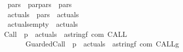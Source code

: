 \begin{isabellebody}
\ \ {\isachardoublequoteopen}{\isacharunderscore}pars{\isachardoublequoteclose}\ {\isacharcolon}{\isacharcolon}\ {\isachardoublequoteopen}{\isacharbrackleft}par{\isacharcomma}pars{\isacharbrackright}\ {\isasymRightarrow}\ pars{\isachardoublequoteclose}\ \ \ \ \ \ \ \ \ \ \ \ \ \ \ \ \ \ \ \ \ \ {\isacharparenleft}{\isachardoublequoteopen}{\isacharunderscore}{\isacharcomma}{\isacharslash}{\isacharunderscore}{\isachardoublequoteclose}{\isacharparenright}\isanewline
\ \ {\isachardoublequoteopen}{\isacharunderscore}actuals{\isachardoublequoteclose}\ {\isacharcolon}{\isacharcolon}\ {\isachardoublequoteopen}pars\ {\isasymRightarrow}\ actuals{\isachardoublequoteclose}\ \ \ \ \ \ \ \ \ \ \ \ \ \ \ \ \ \ \ \ \ \ {\isacharparenleft}{\isachardoublequoteopen}{\isacharprime}{\isacharparenleft}{\isacharunderscore}{\isacharprime}{\isacharparenright}{\isachardoublequoteclose}{\isacharparenright}\isanewline
\ \ {\isachardoublequoteopen}{\isacharunderscore}actuals{\isacharunderscore}empty{\isachardoublequoteclose}\ {\isacharcolon}{\isacharcolon}\ {\isachardoublequoteopen}actuals{\isachardoublequoteclose}\ \ \ \ \ \ \ \ \ \ \ \ \ \ \ \ \ \ \ \ \ \ \ \ {\isacharparenleft}{\isachardoublequoteopen}{\isacharprime}{\isacharparenleft}{\isacharprime}{\isacharparenright}{\isachardoublequoteclose}{\isacharparenright}\isanewline
\isanewline
{}\isamarkupfalse%
\ {\isachardoublequoteopen}{\isacharunderscore}Call{\isachardoublequoteclose}\ {\isacharcolon}{\isacharcolon}\ {\isachardoublequoteopen}{\isacharprime}p\ {\isasymRightarrow}\ actuals\ {\isasymRightarrow}\ {\isacharparenleft}{\isacharparenleft}{\isacharprime}a{\isacharcomma}string{\isacharcomma}{\isacharprime}f{\isacharparenright}\ com{\isacharparenright}{\isachardoublequoteclose}\ {\isacharparenleft}{\isachardoublequoteopen}CALL\ {\isacharunderscore}{\isacharunderscore}{\isachardoublequoteclose}\ {\isacharbrackleft}{}{}{}{}{\isacharcomma}{}{}{}{}{\isacharbrackright}\ {}{}{\isacharparenright}\isanewline
\ \ \ \ \ \ \ {\isachardoublequoteopen}{\isacharunderscore}GuardedCall{\isachardoublequoteclose}\ {\isacharcolon}{\isacharcolon}\ {\isachardoublequoteopen}{\isacharprime}p\ {\isasymRightarrow}\ actuals\ {\isasymRightarrow}\ {\isacharparenleft}{\isacharparenleft}{\isacharprime}a{\isacharcomma}string{\isacharcomma}{\isacharprime}f{\isacharparenright}\ com{\isacharparenright}{\isachardoublequoteclose}\ {\isacharparenleft}{\isachardoublequoteopen}CALL\isactrlsub g\ {\isacharunderscore}{\isacharunderscore}{\isachardoublequoteclose}\ {\isacharbrackleft}{}{}{}{}{\isacharcomma}{}{}{}{}{\isacharbrackright}\ {}{}{\isacharparenright}\isanewline

\end{isabellebody}
